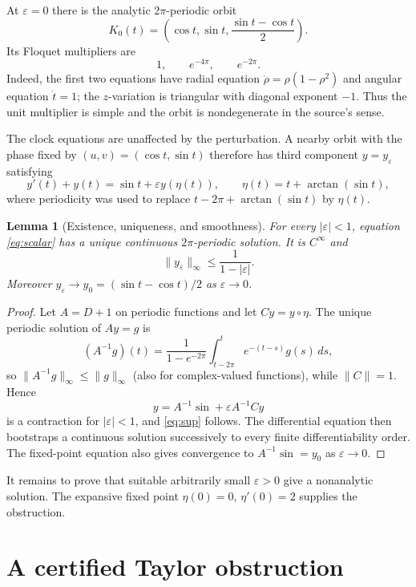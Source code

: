 \documentclass[11pt]{article}
\newtheorem{lemma}[theorem]{Lemma}
\newcommand{\e}{\varepsilon}
\newcommand{\norm}[1]{\lVert#1\rVert}
\begin{document}
At $\e=0$ there is the analytic $2\pi$-periodic orbit
\begin{equation}\label{eq:K0}
 K_0(t)=\left(\cos t,\sin t,\frac{\sin t-\cos t}{2}\right).
\end{equation}
Its Floquet multipliers are
\[
 1,\qquad e^{-4\pi},\qquad e^{-2\pi}.
\]
Indeed, the first two equations have radial equation
$\dot\rho=\rho(1-\rho^2)$ and angular equation $\dot t=1$; the $z$-variation
is triangular with diagonal exponent $-1$.  Thus the unit multiplier is
simple and the orbit is nondegenerate in the source's sense.

The clock equations are unaffected by the perturbation.  A nearby orbit with
the phase fixed by $(u,v)=(\cos t,\sin t)$ therefore has third component
$y=y_\e$ satisfying
\begin{equation}\label{eq:scalar}
 y'(t)+y(t)=\sin t+\e y(\eta(t)),
 \qquad \eta(t)=t+\arctan(\sin t),
\end{equation}
where periodicity was used to replace
$t-2\pi+\arctan(\sin t)$ by $\eta(t)$.

\begin{lemma}[Existence, uniqueness, and smoothness]\label{lem:fixed}
For every $|\e|<1$, equation \eqref{eq:scalar} has a unique continuous
$2\pi$-periodic solution.  It is $C^\infty$ and
\begin{equation}\label{eq:sup}
 \norm{y_\e}_\infty\le \frac1{1-|\e|}.
\end{equation}
Moreover $y_\e\to y_0=(\sin t-\cos t)/2$ as $\e\to0$.
\end{lemma}

\begin{proof}
Let $A=D+1$ on periodic functions and let $C y=y\circ\eta$.  The unique
periodic solution of $Ay=g$ is
\[
 (A^{-1}g)(t)=\frac1{1-e^{-2\pi}}
 \int_{t-2\pi}^{t}e^{-(t-s)}g(s)\,ds,
\]
so $\norm{A^{-1}g}_\infty\le\norm{g}_\infty$ (also for complex-valued
functions), while $\norm C=1$.  Hence
\[
 y=A^{-1}\sin+\e A^{-1}Cy
\]
is a contraction for $|\e|<1$, and \eqref{eq:sup} follows.  The differential
equation then bootstraps a continuous solution successively to every finite
differentiability order.  The fixed-point equation also gives convergence to
$A^{-1}\sin=y_0$ as $\e\to0$.
\end{proof}

It remains to prove that suitable arbitrarily small $\e>0$ give a nonanalytic
solution.  The expansive fixed point $\eta(0)=0$, $\eta'(0)=2$ supplies the
obstruction.

\section*{A certified Taylor obstruction}
\end{document}
